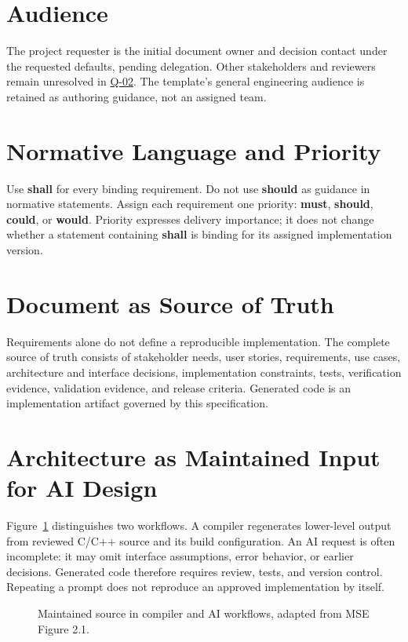 \section{Audience}
The project requester is the initial document owner and decision contact under
the requested defaults, pending delegation. Other stakeholders and reviewers
remain unresolved in \hyperref[Question:Q-02]{Q-02}. The template's general
engineering audience is retained as authoring guidance, not an assigned team.

\section{Normative Language and Priority}
Use \textbf{shall} for every binding requirement. Do not use \textbf{should} as
guidance in normative statements. Assign each requirement one priority:
\textbf{\gls{must}}, \textbf{\gls{should}}, \textbf{\gls{could}}, or
\textbf{\gls{would}}. Priority expresses delivery importance; it does not change
whether a statement containing \textbf{shall} is binding for its assigned
implementation version.

\section{Document as Source of Truth}
Requirements alone do not define a reproducible implementation. The complete
source of truth consists of stakeholder needs, user stories, requirements, use
cases, architecture and interface decisions, implementation constraints,
tests, verification evidence, validation evidence, and release criteria.
Generated code is an implementation artifact governed by this specification.

\section{Architecture as Maintained Input for AI Design}
\label{Section:ArchitectureAIDesign}
Figure~\ref{Figure:MaintainedSourceComparison} distinguishes two workflows.
A compiler regenerates lower-level output from reviewed C/C++ source and its
build configuration. An AI request is often incomplete: it may omit interface
assumptions, error behavior, or earlier decisions. Generated code therefore
requires review, tests, and version control. Repeating a prompt does not
reproduce an approved implementation by itself.

\begin{figure}[htbp]
\centering
\resizebox{\textwidth}{!}{}
\caption{Maintained source in compiler and AI workflows, adapted from MSE Figure 2.1.}
\label{Figure:MaintainedSourceComparison}
\end{figure}


